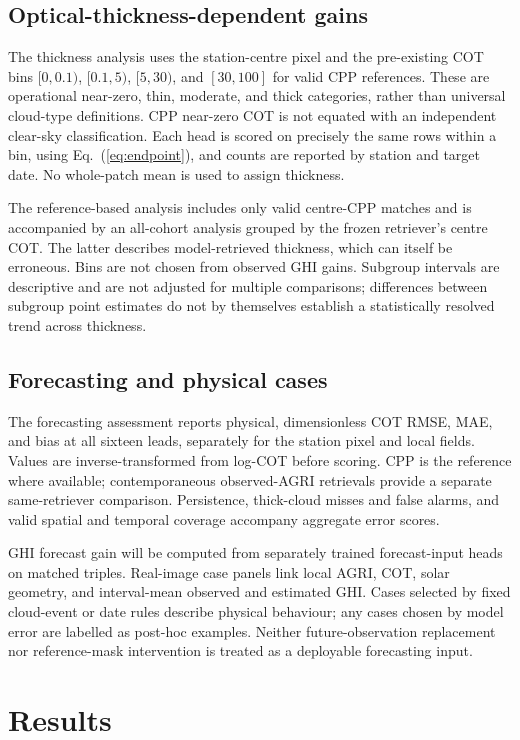 \documentclass[11pt]{article}
\begin{document}
\subsection{Optical-thickness-dependent gains}
The thickness analysis uses the station-centre pixel and the pre-existing COT bins $[0,0.1)$, $[0.1,5)$, $[5,30)$, and $[30,100]$ for valid CPP references. These are operational near-zero, thin, moderate, and thick categories, rather than universal cloud-type definitions. CPP near-zero COT is not equated with an independent clear-sky classification. Each head is scored on precisely the same rows within a bin, using Eq.~(\ref{eq:endpoint}), and counts are reported by station and target date. No whole-patch mean is used to assign thickness.

The reference-based analysis includes only valid centre-CPP matches and is accompanied by an all-cohort analysis grouped by the frozen retriever's centre COT. The latter describes model-retrieved thickness, which can itself be erroneous. Bins are not chosen from observed GHI gains. Subgroup intervals are descriptive and are not adjusted for multiple comparisons; differences between subgroup point estimates do not by themselves establish a statistically resolved trend across thickness.

\subsection{Forecasting and physical cases}
The forecasting assessment reports physical, dimensionless COT RMSE, MAE, and bias at all sixteen leads, separately for the station pixel and local fields. Values are inverse-transformed from log-COT before scoring. CPP is the reference where available; contemporaneous observed-AGRI retrievals provide a separate same-retriever comparison. Persistence, thick-cloud misses and false alarms, and valid spatial and temporal coverage accompany aggregate error scores.

GHI forecast gain will be computed from separately trained forecast-input heads on matched triples. Real-image case panels link local AGRI, COT, solar geometry, and interval-mean observed and estimated GHI. Cases selected by fixed cloud-event or date rules describe physical behaviour; any cases chosen by model error are labelled as post-hoc examples. Neither future-observation replacement nor reference-mask intervention is treated as a deployable forecasting input.
\section{Results}
\end{document}
